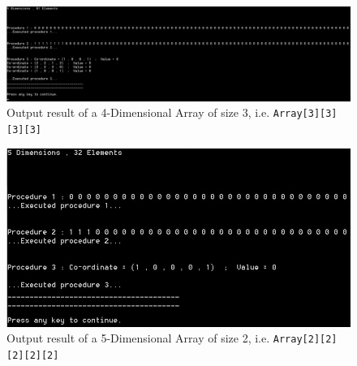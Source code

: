 \documentclass[10pt, conference]{IEEEtran}
\begin{document}
\begin{appendices}
\begin{figure}[h!]
\renewcommand{\thefigure}{\arabic{figure}}
\centering
\includegraphics[scale=0.48]{Result4D.jpg}
\caption{Output result of a 4-Dimensional Array of size 3, i.e. \texttt{Array[3][3][3][3]} }
\label{Result4D}
\end{figure}

\begin{figure}[h!]
\renewcommand{\thefigure}{\arabic{figure}}
\centering
\includegraphics[scale=1]{Result5D.jpg}
\caption{Output result of a 5-Dimensional Array of size 2, i.e. \texttt{Array[2][2][2][2][2]} }
\label{Result5D}
\end{figure}

\end{appendices}




\end{document}
